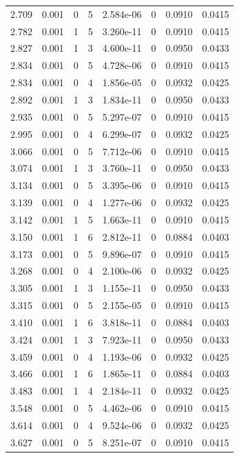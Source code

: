 \documentclass[preview]{standalone}
\begin{document}
{{{\begin{tabular}{L{1.2cm}C{1.2cm} C{0.3cm}C{0.5cm} C{1.4cm}C{1.4cm} C{1.4cm}C{1.4cm}}
  2.709  &  0.001  & 0     &  5 &  2.584e-06  & 0  & 0.0910 &  0.0415   \\ 
  2.782  &  0.001  & 1     &  5 &  3.260e-11  & 0  & 0.0910 &  0.0415   \\ 
  2.827  &  0.001  & 1     &  3 &  4.600e-11  & 0  & 0.0950 &  0.0433   \\ 
  2.834  &  0.001  & 0     &  5 &  4.728e-06  & 0  & 0.0910 &  0.0415   \\ 
  2.834  &  0.001  & 0     &  4 &  1.856e-05  & 0  & 0.0932 &  0.0425   \\ 
  2.892  &  0.001  & 1     &  3 &  1.834e-11  & 0  & 0.0950 &  0.0433   \\ 
  2.935  &  0.001  & 0     &  5 &  5.297e-07  & 0  & 0.0910 &  0.0415   \\ 
  2.995  &  0.001  & 0     &  4 &  6.299e-07  & 0  & 0.0932 &  0.0425   \\ 
  3.066  &  0.001  & 0     &  5 &  7.712e-06  & 0  & 0.0910 &  0.0415   \\ 
  3.074  &  0.001  & 1     &  3 &  3.760e-11  & 0  & 0.0950 &  0.0433   \\ 
  3.134  &  0.001  & 0     &  5 &  3.395e-06  & 0  & 0.0910 &  0.0415   \\ 
  3.139  &  0.001  & 0     &  4 &  1.277e-06  & 0  & 0.0932 &  0.0425   \\ 
  3.142  &  0.001  & 1     &  5 &  1.663e-11  & 0  & 0.0910 &  0.0415   \\ 
  3.150  &  0.001  & 1     &  6 &  2.812e-11  & 0  & 0.0884 &  0.0403   \\ 
  3.173  &  0.001  & 0     &  5 &  9.896e-07  & 0  & 0.0910 &  0.0415   \\ 
  3.268  &  0.001  & 0     &  4 &  2.100e-06  & 0  & 0.0932 &  0.0425   \\ 
  3.305  &  0.001  & 1     &  3 &  1.155e-11  & 0  & 0.0950 &  0.0433   \\ 
  3.315  &  0.001  & 0     &  5 &  2.155e-05  & 0  & 0.0910 &  0.0415   \\ 
  3.410  &  0.001  & 1     &  6 &  3.818e-11  & 0  & 0.0884 &  0.0403   \\ 
  3.424  &  0.001  & 1     &  3 &  7.923e-11  & 0  & 0.0950 &  0.0433   \\ 
  3.459  &  0.001  & 0     &  4 &  1.193e-06  & 0  & 0.0932 &  0.0425   \\ 
  3.466  &  0.001  & 1     &  6 &  1.865e-11  & 0  & 0.0884 &  0.0403   \\ 
  3.483  &  0.001  & 1     &  4 &  2.184e-11  & 0  & 0.0932 &  0.0425   \\ 
  3.548  &  0.001  & 0     &  5 &  4.462e-06  & 0  & 0.0910 &  0.0415   \\ 
  3.614  &  0.001  & 0     &  4 &  9.524e-06  & 0  & 0.0932 &  0.0425   \\ 
  3.627  &  0.001  & 0     &  5 &  8.251e-07  & 0  & 0.0910 &  0.0415   \\ 
\hline 
\end{tabular} 

}}}
\end{document}
